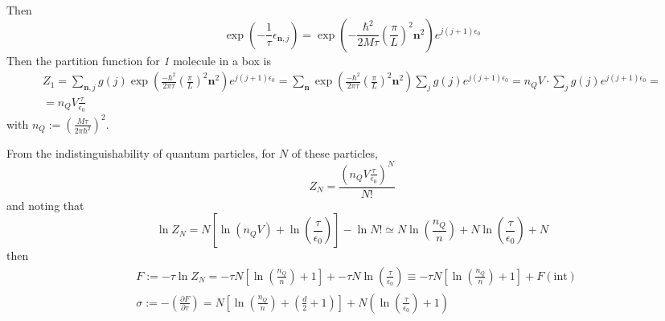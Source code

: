 \documentclass[10pt]{amsart}
\begin{document}
\begin{multicols*}{2}
Then
\[
\exp{\left( -\frac{1}{\tau} \epsilon_{\mathbf{n},j} \right) } = \exp{ \left( -\frac{\hbar^2}{2M\tau} \left( \frac{\pi}{L} \right)^2 \mathbf{n}^2 \right) } e^{j(j+1) \epsilon_0 }
\]
Then the partition function for \emph{1} molecule in a box is 
\[
\begin{gathered}
  Z_1 = \sum_{\mathbf{n},j} g(j) \exp{ \left( \frac{-\hbar^2}{2\pi \tau} \left( \frac{\pi}{L} \right)^2 \mathbf{n}^2 \right) } e^{j(j+1) \epsilon_0 } = \sum_{\mathbf{n}} \exp{ \left( \frac{ -\hbar^2}{2\pi \tau} \left( \frac{\pi}{L} \right)^2 \mathbf{n}^2 \right) } \sum_j g(j) e^{j(j+1)\epsilon_0 } = n_Q V \cdot \sum_j g(j) e^{j(j+1)\epsilon_0} = \\
  =  n_Q V \frac{\tau}{\epsilon_0 }
\end{gathered}
\]
with $n_Q := \left( \frac{M\tau}{2\pi \hbar^2 } \right)^2$. 

From the indistinguishability of quantum particles, for $N$ of these particles,
\[
Z_N = \frac{ (n_Q V \frac{ \tau}{\epsilon_0 } )^N }{ N!} 
\]
and noting that 
\[
\ln{Z_N} = N\left[ \ln{ (n_Q V)} + \ln{ \left( \frac{\tau}{\epsilon_0 } \right) } \right] - \ln{N!} \simeq N \ln{ \left( \frac{n_Q}{n} \right) } + N \ln{ \left( \frac{\tau}{\epsilon_0 } \right) } + N 
\]
then
\[
\begin{aligned}
  & F := -\tau \ln{Z_N} = -\tau N \left[ \ln{ \left( \frac{n_Q}{n} \right) } + 1 \right] + - \tau N \ln{ \left( \frac{\tau}{\epsilon_0 } \right) } \equiv - \tau N \left[ \ln{ \left( \frac{n_Q}{n} \right) } + 1 \right] + F(\text{int}) \\ 
  & \sigma := -\left( \frac{ \partial F}{ \partial \tau } \right) = N \left[ \ln{ \left( \frac{n_Q}{n} \right) } + \left( \frac{d}{2} + 1 \right) \right] + N \left( \ln{ \left( \frac{\tau}{\epsilon_0} \right) } + 1 \right)
\end{aligned}
\]


\end{multicols*}
\end{document}
